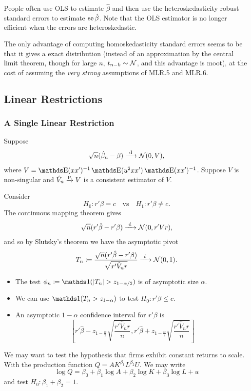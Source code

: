 \documentclass[letterpaper, 10pt]{article}
\begin{document}
\begin{remark}
  People often use OLS to estimate \(\hat{\beta}\) and then use the heteroskedasticity robust standard errors to estimate \(\operatorname{se} \hat{\beta}\).
  Note that the OLS estimator is no longer efficient when the errors are heteroskedastic.

  The only advantage of computing homoskedasticity standard errors seems to be that it gives a exact distribution (instead of an approximation by the central limit theorem, though for large \(n\), \(t_{n - k} \sim \mathcal{N}\), and this advantage is moot), at the cost of assuming the \emph{very strong} assumptions of MLR.5 and MLR.6.
\end{remark}


\subsection{Linear Restrictions}
\subsubsection{A Single Linear Restriction}
Suppose
\[
  \sqrt{n} (\hat{\beta}_n - \beta) \xrightarrow{\ \mathrm{d}\ } \mathcal{N}(0, V),
\]
where \(V = \E(xx')^{-1} \E(u^2 xx') \E(xx')^{-1}\).
Suppose \(V\) is non-singular and \(\hat{V}_n \xrightarrow{\mathrm{p}} V\) is a consistent estimator of \(V\).

Consider
\[
  H_0: r' \beta = c
  \quad\text{vs}\quad
  H_1: r' \beta \neq c.
\]
The continuous mapping theorem gives
\[
  \sqrt{n} (r' \hat{\beta} - r' \beta)
  \xrightarrow{\ \mathrm{d}\ } \mathcal{N}(0, r' V r),
\]
and so by Slutsky's theorem we have the asymptotic pivot
\[
  T_n
  \coloneqq \frac{\sqrt{n} (r' \hat{\beta} - r' \beta)}{\sqrt{r' \hat{V}_n r}}
  \xrightarrow{\ \mathrm{d}\ } \mathcal{N}(0, 1).
\]
\begin{itemize}
  \item The test \(\phi_n \coloneqq \ind(\abs{T_n} > z_{1 - \alpha / 2})\) is of asymptotic size \(\alpha\).
  \item We can use \(\ind(T_n > z_{1 - \alpha})\) to test \(H_0: r' \beta \leq c\).
  \item An asymptotic \(1 - \alpha\) confidence interval for \(r' \beta\) is
    \[
      \left[
        r' \hat{\beta} - z_{1 - \frac{\alpha}{2}} \sqrt{\frac{r' \hat{V}_n r}{n}},
        r' \hat{\beta} + z_{1 - \frac{\alpha}{2}} \sqrt{\frac{r' \hat{V}_n r}{n}}
      \right]
    \]
\end{itemize}

\begin{example}
  We may want to test the hypothesis that firms exhibit constant returns to scale.
  With the production function \(Q = A K^{\beta_1} L^{\beta_2} U\).
  We may write
  \[
    \log Q = \beta_0 + \beta_1 \log A + \beta_2 \log K + \beta_3 \log L + u
  \]
  and test \(H_0: \beta_1 + \beta_2 = 1\).
\end{example}
\end{document}
